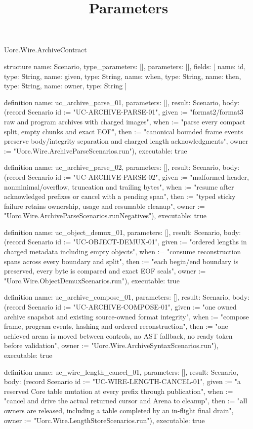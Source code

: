 \begin{lexlean}{Uorc.Wire.ArchiveContract}
\title{Parameters}
\begin{semanticmodule}
structure{
  name: Scenario,
  type_parameters: [],
  parameters: [],
  fields: [
    {name: id, type: String},
    {name: given, type: String},
    {name: when, type: String},
    {name: then, type: String},
    {name: owner, type: String}
  ]
}

definition{
  name: uc_archive_parse_01,
  parameters: [],
  result: Scenario,
  body: (record Scenario {id := "UC-ARCHIVE-PARSE-01", given := "format2/format3 raw and program archives with charged images", when := "parse every compact split, empty chunks and exact EOF", then := "canonical bounded frame events preserve body/integrity separation and charged length acknowledgments", owner := "Uorc.Wire.ArchiveParseScenarios.run"}),
  executable: true
}

definition{
  name: uc_archive_parse_02,
  parameters: [],
  result: Scenario,
  body: (record Scenario {id := "UC-ARCHIVE-PARSE-02", given := "malformed header, nonminimal/overflow, truncation and trailing bytes", when := "resume after acknowledged prefixes or cancel with a pending span", then := "typed sticky failure retains ownership, usage and resumable cleanup", owner := "Uorc.Wire.ArchiveParseScenarios.runNegatives"}),
  executable: true
}

definition{
  name: uc_object_demux_01,
  parameters: [],
  result: Scenario,
  body: (record Scenario {id := "UC-OBJECT-DEMUX-01", given := "ordered lengths in charged metadata including empty objects", when := "consume reconstruction spans across every boundary and split", then := "each begin/end boundary is preserved, every byte is compared and exact EOF seals", owner := "Uorc.Wire.ObjectDemuxScenarios.run"}),
  executable: true
}

definition{
  name: uc_archive_compose_01,
  parameters: [],
  result: Scenario,
  body: (record Scenario {id := "UC-ARCHIVE-COMPOSE-01", given := "one owned archive snapshot and existing source-owned format integrity", when := "compose frame, program events, hashing and ordered reconstruction", then := "one achieved arena is moved between controls, no AST fallback, no ready token before validation", owner := "Uorc.Wire.ArchiveSyntaxScenarios.run"}),
  executable: true
}

definition{
  name: uc_wire_length_cancel_01,
  parameters: [],
  result: Scenario,
  body: (record Scenario {id := "UC-WIRE-LENGTH-CANCEL-01", given := "a reserved Core table mutation at every prefix through publication", when := "cancel and drive the actual returned cursor and Arena to cleanup", then := "all owners are released, including a table completed by an in-flight final drain", owner := "Uorc.Wire.LengthStoreScenarios.run"}),
  executable: true
}


\end{semanticmodule}
\end{lexlean}

